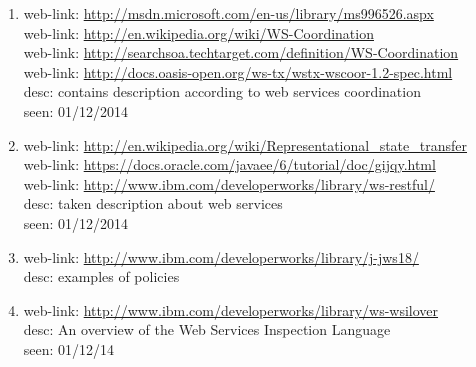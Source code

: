 {\begin{enumerate}
\item \label{Web Services Coordination} web-link: \url{http://msdn.microsoft.com/en-us/library/ms996526.aspx}  \\
web-link: \url{http://en.wikipedia.org/wiki/WS-Coordination}  \\
web-link: \url{http://searchsoa.techtarget.com/definition/WS-Coordination}  \\ 
web-link: \url{http://docs.oasis-open.org/ws-tx/wstx-wscoor-1.2-spec.html}  \\ desc: contains description according to web services coordination  \\ seen: 01/12/2014  \\
\item \label{RESTful Web Services} web-link: \url{http://en.wikipedia.org/wiki/Representational_state_transfer}  \\
web-link: \url{https://docs.oracle.com/javaee/6/tutorial/doc/gijqy.html}  \\ 
web-link: \url{http://www.ibm.com/developerworks/library/ws-restful/}  \\ desc: taken description about web services  \\ seen: 01/12/2014 \\
\item \label{ws-policy} web-link: 
\url{http://www.ibm.com/developerworks/library/j-jws18/}  \\ desc: examples of policies
\item \label{ws-disc} web-link: \url{http://www.ibm.com/developerworks/library/ws-wsilover} \\ desc: An overview of the Web Services Inspection Language\\ seen: 01/12/14
\end{enumerate}
}

